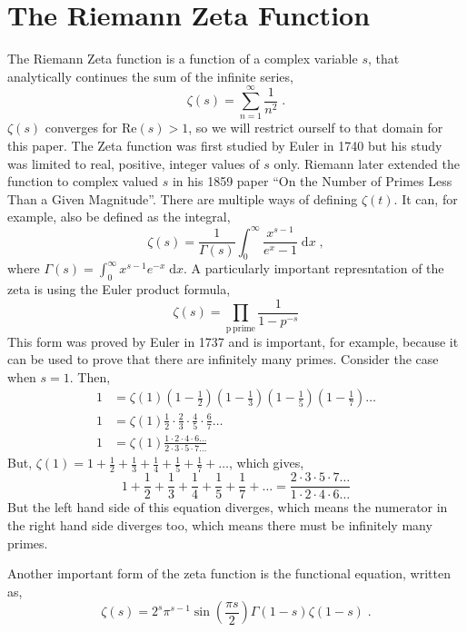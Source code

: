 \documentclass{amsproc}
\newcommand{\be}{\begin{equation}}
\newcommand{\ee}{\end{equation}}
\newcommand{\df}{\; \mathrm{d}}
\theoremstyle{definition}
\theoremstyle{remark}
\numberwithin{equation}{section}
\begin{document}
\section{The Riemann Zeta Function}
The Riemann Zeta function is a function of a complex variable $s$, that analytically continues the sum of the infinite series,
\be
\zeta(s) = \sum_{n = 1}^{\infty} \frac{1}{n^2} \;.
\ee
$\zeta(s)$ converges for $\mathrm{Re}(s) > 1$, so we will restrict ourself to that domain for this paper. The Zeta function was first studied by Euler in 1740 but his study was limited to real, positive, integer values of $s$ only. Riemann later extended the function to complex valued $s$ in his 1859 paper ``On the Number of Primes Less Than a Given Magnitude''. There are multiple ways of defining $\zeta(t)$. It can, for example, also be defined as the integral,
\be
\zeta(s) = \frac{1}{ \Gamma(s) } \int_0^{\infty} \frac{ x^{s -1} }{ e^x - 1} \df x \;,
\ee
where $\Gamma(s) = \int_0^{\infty} x^{s - 1} e^{-x} \df x$. A particularly important represntation of the zeta is using the Euler product formula, 
\be
\zeta(s) = \prod_{\mathrm{p~prime}} \frac{1}{1 - p^{-s}}
\ee
This form was proved by Euler in 1737 and is important, for example, because it can be used to prove that there are infinitely many primes. Consider the case when $s = 1$. Then,
\begin{align*}
 1 &= \zeta(1) \left( 1 - \frac{1}{2} \right) \left( 1 - \frac{1}{3} \right) \left( 1 - \frac{1}{5} \right) \left( 1 - \frac{1}{7} \right) \ldots \\
 1 &= \zeta(1) \frac{1}{2} \cdot \frac{2}{3} \cdot \frac{4}{5} \cdot \frac{6}{7} \ldots \\
  1 &= \zeta(1) \frac{1 \cdot 2 \cdot 4 \cdot 6 \ldots}{2 \cdot 3 \cdot 5 \cdot 7 \ldots } 
\end{align*}
But, $\zeta(1) = 1 + \frac{1}{2} + \frac{1}{3} + \frac{1}{4} + \frac{1}{5} + \frac{1}{7} + \ldots$, which gives,
\begin{equation*}
 1 + \frac{1}{2} + \frac{1}{3} + \frac{1}{4} + \frac{1}{5} + \frac{1}{7} + \ldots =  \frac{2 \cdot 3 \cdot 5 \cdot 7 \ldots }{1 \cdot 2 \cdot 4 \cdot 6 \ldots}
\end{equation*}
But the left hand side of this equation diverges, which means the numerator in the right hand side diverges too, which means there must be infinitely many primes.  

Another important form of the zeta function is the functional equation, written as,
\be
\zeta(s) = 2^s \pi^{s - 1} \sin{ \left( \frac{\pi s}{2} \right) } \Gamma(1 - s) \zeta( 1 - s) \;.
\ee
\end{document}
